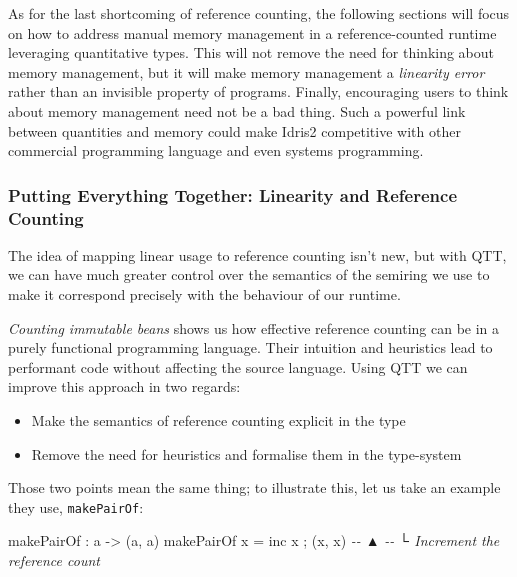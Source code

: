 \documentclass[
]{article}
\newenvironment{Shaded}{}{}
\newcommand{\CommentTok}[1]{\textcolor[rgb]{0.38,0.63,0.69}{\textit{#1}}}
\newcommand{\NormalTok}[1]{#1}
\newcommand{\OperatorTok}[1]{\textcolor[rgb]{0.40,0.40,0.40}{#1}}
\newcommand{\OtherTok}[1]{\textcolor[rgb]{0.00,0.44,0.13}{#1}}
\providecommand{\tightlist}{%
  \setlength{\itemsep}{0pt}\setlength{\parskip}{0pt}}
\begin{document}
As for the last shortcoming of reference counting, the following
sections will focus on how to address manual memory management in a
reference-counted runtime leveraging quantitative types. This will not
remove the need for thinking about memory management, but it will make
memory management a \emph{linearity error} rather than an invisible
property of programs. Finally, encouraging users to think about memory
management need not be a bad thing. Such a powerful link between
quantities and memory could make Idris2 competitive with other
commercial programming language and even systems programming.

\hypertarget{putting-everything-together-linearity-and-reference-counting}{%
\subsubsection{Putting Everything Together: Linearity and Reference
Counting}\label{putting-everything-together-linearity-and-reference-counting}}

\label{subsec:linear-ref-counting}

The idea of mapping linear usage to reference counting isn't
new\cite{linear_ref_count}, but with QTT, we can have much greater
control over the semantics of the semiring we use to make it correspond
precisely with the behaviour of our runtime.

\emph{Counting immutable beans}\cite{immutable_beans} shows us how
effective reference counting can be in a purely functional programming
language. Their intuition and heuristics lead to performant code without
affecting the source language. Using QTT we can improve this approach in
two regards:

\begin{itemize}
\tightlist
\item
  Make the semantics of reference counting explicit in the type
\item
  Remove the need for heuristics and formalise them in the type-system
\end{itemize}

Those two points mean the same thing; to illustrate this, let us take an
example they use, \texttt{makePairOf}:

\begin{Shaded}
\begin{Highlighting}[]
\NormalTok{makePairOf }\OperatorTok{:}\NormalTok{ a }\OtherTok{{-}\textgreater{}}\NormalTok{ (a, a)}
\NormalTok{makePairOf x }\OtherTok{=}\NormalTok{ inc x ; (x, x)}
\CommentTok{{-}{-}               ▲}
\CommentTok{{-}{-}               └ Increment the reference count}
\end{Highlighting}
\end{Shaded}
\end{document}
